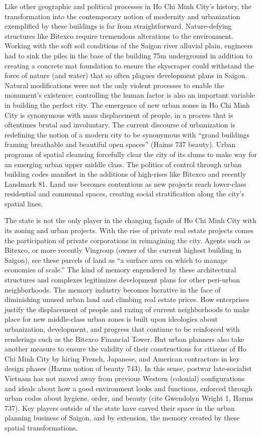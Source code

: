 Like other geographic and political processes in Ho Chi Minh City’s history, the transformation into the contemporary notion of modernity and urbanization exemplified by these buildings is far from straightforward. Nature-defying structures like Bitexco require tremendous alterations to the environment. Working with the soft soil conditions of the Saigon river alluvial plain, engineers had to sink the piles in the base of the building 75m underground in addition to creating a concrete mat foundation to ensure the skyscraper could withstand the force of nature (and water) that so often plagues development plans in Saigon. Natural modifications were not the only violent processes to enable the monument’s existence; controlling the human factor is also an important variable in building the perfect city. The emergence of new urban zones in Ho Chi Minh City is synonymous with mass displacement of people, in a process that is oftentimes brutal and involuntary. The current discourse of urbanization is redefining the notion of a modern city to be synonymous with “grand buildings framing breathable and beautiful open spaces” (Haims 737 beauty). Urban programs of spatial cleansing forcefully clear the city of its slums to make way for an emerging urban upper middle class. The politics of control through urban building codes manifest in the additions of high-rises like Bitexco and recently Landmark 81. Land use becomes contentious as new projects reach lower-class residential and communal spaces, creating social stratification along the city’s spatial lines.

 The state is not the only player in the changing façade of Ho Chi Minh City with its zoning and urban projects. With the rise of private real estate projects comes the participation of private corporations in reimagining the city. Agents such as Bitexco, or more recently Vingroup (owner of the current highest building in Saigon), see these parcels of land as “a surface area on which to manage economies of scale.” The kind of memory engendered by these architectural structures and complexes legitimizes development plans for other peri-urban neighborhoods. The memory industry becomes lucrative in the face of diminishing unused urban land and climbing real estate prices. How enterprises justify the displacement of people and razing of current neighborhoods to make place for new middle-class urban zones is built upon ideologies about urbanization, development, and progress that continue to be reinforced with renderings such as the Bitexco Financial Tower. But urban planners also take another measure to ensure the validity of their constructions for citizens of Ho Chi Minh City by hiring French, Japanese, and American contractors in key design phases (Harms notion of beauty 743). In this sense, postwar late-socialist Vietnam has not moved away from previous Western (colonial) configurations and ideals about how a good environment looks and functions, enforced through urban codes about hygiene, order, and beauty (cite Gwendolyn Wright 1, Harms 737). Key players outside of the state have carved their space in the urban planning business of Saigon, and by extension, the memory created by these spatial transformations.

